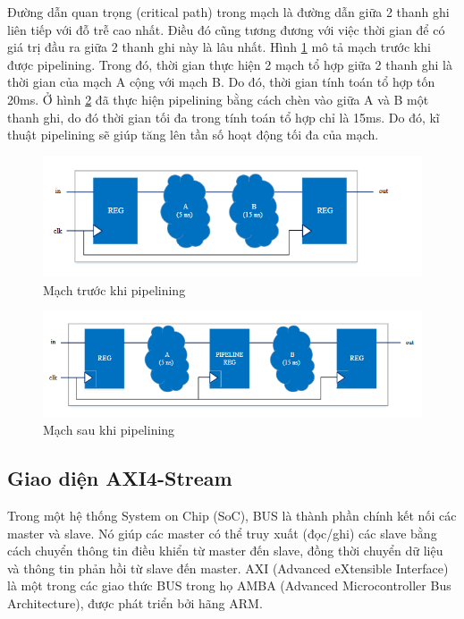 Đường dẫn quan trọng (critical path) trong mạch là đường dẫn giữa 2 thanh ghi liên tiếp với đỗ trễ cao nhất. Điều đó cũng tương đương với việc thời gian để có giá trị đầu ra giữa 2 thanh ghi này là lâu nhất.  Hình \ref{fig:pipeline1} mô tả mạch trước khi được pipelining. Trong đó, thời gian thực hiện 2 mạch tổ hợp giữa 2 thanh ghi là thời gian của mạch A cộng với mạch B. Do đó, thời gian tính toán tổ hợp tốn 20ms. Ở hình \ref{fig:pipeline2} đã thực hiện pipelining bằng cách chèn vào giữa A và B một thanh ghi, do đó thời gian tối đa trong tính toán tổ hợp chỉ là 15ms. Do đó, kĩ thuật pipelining sẽ giúp tăng lên tần số hoạt động tối đa của mạch. 
\begin{figure}[!ht]
    \centering
    \includegraphics[width=\linewidth]{figures/pipeline1.png}
    \caption{Mạch trước khi pipelining}
    \label{fig:pipeline1}
\end{figure}
\begin{figure}[!ht]
    \centering
    \includegraphics[width=\linewidth]{figures/pipeline2.png}
    \caption{Mạch sau khi pipelining}
    \label{fig:pipeline2}
\end{figure}
\subsection{Giao diện AXI4-Stream}
Trong một hệ thống System on Chip (SoC), BUS là thành phần chính kết nối các master và slave. Nó giúp các master có thể truy xuất (đọc/ghi) các slave bằng cách chuyển thông tin điều khiển từ master đến slave, đồng thời chuyển dữ liệu và thông tin phản hồi từ slave đến master. AXI (Advanced eXtensible Interface) là một trong các giao thức BUS trong họ AMBA (Advanced Microcontroller Bus Architecture), được phát triển bởi hãng ARM. 

